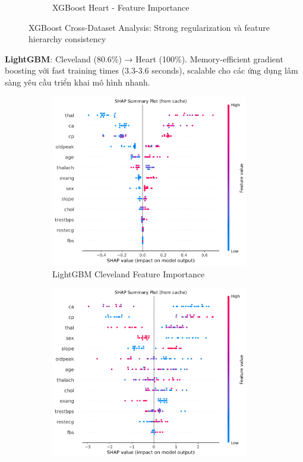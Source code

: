 \begin{figure}[H]
\begin{subfigure}[b]{0.48\textwidth}
\caption{XGBoost Heart - Feature Importance}
\label{fig:xgboost_shap_heart_analysis}
\end{subfigure}
\caption{XGBoost Cross-Dataset Analysis: Strong regularization và feature hierarchy consistency}
\label{fig:xgboost_analysis_complete}
\end{figure}

\textbf{LightGBM}: Cleveland (80.6\%) → Heart (100\%). Memory-efficient gradient boosting với fast training times (3.3-3.6 seconds), scalable cho các ứng dụng lâm sàng yêu cầu triển khai mô hình nhanh.

\begin{figure}[H]
\centering
\begin{subfigure}[b]{0.48\textwidth}
\centering
\includegraphics[width=0.95\textwidth]{Result/cleveland_dataset/LightGBM/SHAP/Summary.png}
\caption{LightGBM Cleveland Feature Importance}
\label{fig:lightgbm_shap_cleveland_analysis}
\end{subfigure}
\hfill
\begin{subfigure}[b]{0.48\textwidth}
\centering
\includegraphics[width=0.95\textwidth]{Result/heart_dataset/LightGBM/SHAP/Summary.png}

\end{subfigure}
\end{figure}

